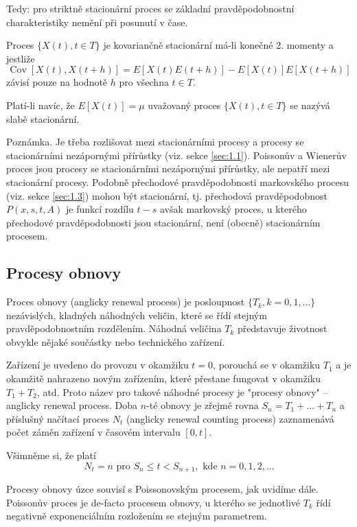 \documentclass[10pt]{article}
\DeclareMathOperator*{\cov}{Cov}
\begin{document}
Tedy: pro striktně stacionární proces se základní pravděpodobnostní charakteristiky nemění při posunutí v čase.

Proces $\{X(t),t \in T\}$ je kovariančně stacionární má-li konečné 2. momenty a jestliže 
\begin{equation}
\cov[X(t),X(t+h)] = E[X(t)E(t+h)] - E[X(t)]E[X(t+h)]
\end{equation}
závisí pouze na hodnotě $h$ pro všechna $t \in T$.

Platí-li navíc, že $E[X(t)] = \mu$ uvažovaný proces $\{X(t),t \in T\}$ se nazývá slabě stacionární.

Poznámka. Je třeba rozlišovat mezi stacionárními procesy a procesy se stacionárními nezápornými přírůstky (viz. sekce \ref{sec:1.1}). Poissonův a Wienerův proces jsou procesy se stacionárními nezápornými přírůstky, ale nepatří mezi stacionární procesy. Podobně přechodové pravděpodobnosti markovského procesu (viz. sekce \ref{sec:1.3}) mohou být stacionární, tj. přechodová pravděpodobnost $P(x,s,t,A)$ je funkcí rozdílu $t-s$ avšak markovský proces, u kterého přechodové pravděpodobnosti jsou stacionární, není (obecně) stacionárním procesem.

\subsection{Procesy obnovy}

Proces obnovy (anglicky renewal process) je posloupnost $\{T_k,k=0,1,...\}$ nezávislých, kladných náhodných veličin, které se řídí stejným pravděpodobnostním rozdělením. Náhodná veličina $T_k$ představuje životnost obvykle nějaké součástky nebo technického zařízení.

Zařízení je uvedeno do provozu v okamžiku $t=0$, porouchá se v okamžiku $T_1$ a je okamžitě nahrazeno novým zařízením, které přestane fungovat v okamžiku $T_1+T_2$, atd. Proto název pro takové náhodné procesy je "procesy obnovy" -- anglicky renewal process. Doba $n$-té obnovy je zřejmě rovna $S_n = T_1 + ... + T_n$ a příslušný načítací proces $N_t$ (anglicky renewal counting process) zaznamenává počet záměn zařízení v časovém intervalu $[0,t]$.

Všimněme si, že platí 
$$N_t=n \text{ pro }S_n\leq t<S_{n+1}, \text{ kde } n=0,1,2,...$$

Procesy obnovy úzce souvisí s Poissonovským procesem, jak uvidíme dále. Poissonův proces je de-facto procesem obnovy, u kterého se jednotlivé $T_k$ řídí negativně exponenciálním rozložením se stejným parametrem.
\end{document}
